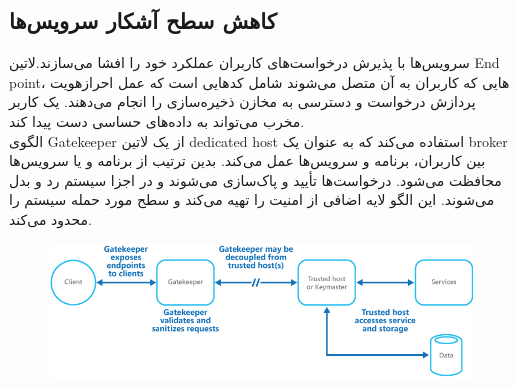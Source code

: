 \subsection{کاهش سطح آشکار سرویس‌ها}
سرویس‌ها با پذیرش درخواست‌های کاربران عملکرد خود را افشا می‌سازند.‌لاتین{ End point‌}هایی که کاربران به آن متصل می‌شوند شامل کدهایی است که عمل احرازهویت ، پردازش درخواست و دسترسی به مخازن ذخیره‌سازی را انجام می‌دهند. یک کاربر مخرب می‌تواند به داده‌های حساسی دست پیدا کند.\\
الگوی Gatekeeper از یک ‌لاتین{ dedicated host}  استفاده می‌کند که به عنوان یک broker بین کاربران، برنامه و سرویس‌ها عمل می‌کند. بدین ترتیب از برنامه و یا سرویس‌ها محافظت می‌شود. درخواست‌ها تأیید و پاک‌سازی می‌شوند و در اجزا سیستم رد و بدل می‌شوند. این الگو لایه اضافی از امنیت را تهیه می‌کند و سطح مورد حمله سیستم را محدود می‌کند. 
\begin{figure}[H]
\centering
\includegraphics[scale=.6]{img/gatekeeper.png}
\end{figure}

